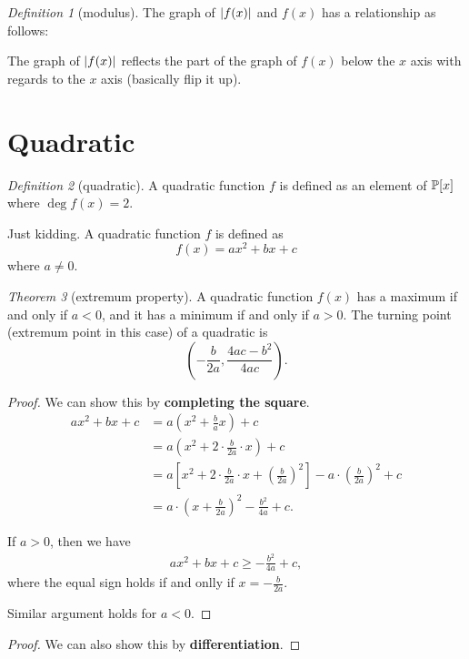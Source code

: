 \documentclass[8pt]{article}
\theoremstyle{remark}
\newtheorem{theorem}{Theorem}[section]
\newtheorem{definition}[theorem]{Definition}
\begin{document}
        \begin{definition}[modulus]
            The graph of $\left\lvert f(x) \right\rvert$ and $f(x)$ has a relationship as follows:

            The graph of $\left\lvert f(x) \right\rvert$ reflects the part of the graph of $f(x)$ below the $x$ axis with regards to the $x$ axis (basically flip it up).
        \end{definition}

    \section{Quadratic}
        \begin{definition}[quadratic]
            A quadratic function $f$ is defined as an element of $\mathbb{P}[x]$ where $\deg f(x) = 2$.

            Just kidding. A quadratic function $f$ is defined as
            $$
            f(x) = ax^2 + bx + c
            $$
            where $a \neq 0$.
        \end{definition}

        \begin{theorem}[extremum property]
            A quadratic function $f(x)$ has a maximum if and only if $a < 0$, and it has a minimum if and only if $a > 0$. The turning point (extremum point in this case) of a quadratic is
            $$
                \left(-\frac{b}{2a}, \frac{4ac - b^2}{4ac}\right).
            $$

            \begin{proof}
                We can show this by \textbf{completing the square}.
                \begin{align*}
                    ax^2 + bx + c &= a \left(x^2 + \frac{b}{a} x\right) + c\\
                    &= a \left(x^2 + 2 \cdot \frac{b}{2a} \cdot x \right) + c\\
                    &= a \left[x^2 + 2 \cdot \frac{b}{2a} \cdot x + \left(\frac{b}{2a}\right)^2\right] - a \cdot \left(\frac{b}{2a}\right)^2 + c\\
                    &= a \cdot \left(x + \frac{b}{2a}\right)^2 - \frac{b^2}{4a} + c.
                \end{align*}

                If $a > 0$, then we have
                \begin{align*}
                    ax^2 + bx + c \geq -\frac{b^2}{4a} + c,
                \end{align*}
                where the equal sign holds if and onlly if $x = - \frac{b}{2a}$.

                Similar argument holds for $a < 0$.
            \end{proof}

            \begin{proof}
                We can also show this by \textbf{differentiation}.
            \end{proof}
        \end{theorem}
\end{document}
